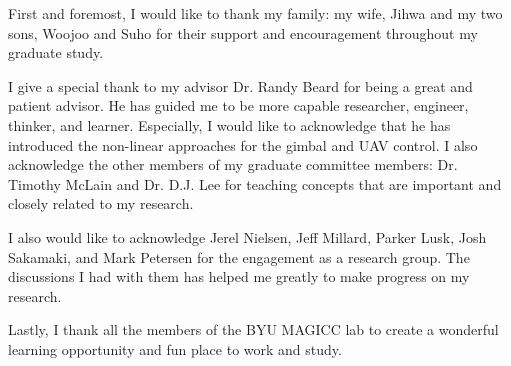 \afterpage{\cleardoublepage}
%
First and foremost, I would like to thank my family: my wife, Jihwa and my two sons, Woojoo and Suho for their support and encouragement throughout my graduate study. 

I give a special thank to my advisor Dr. Randy Beard for being a great and patient advisor. He has guided me to be more capable researcher, engineer, thinker, and learner. Especially, I would like to acknowledge that he has introduced the non-linear approaches for the gimbal and UAV control. I also acknowledge the other members of my graduate committee members: Dr. Timothy McLain and Dr. D.J. Lee for teaching concepts that are important and closely related to my research.

I also would like to acknowledge Jerel Nielsen, Jeff Millard, Parker Lusk, Josh Sakamaki, and Mark Petersen for the engagement as a research group. The discussions I had with them has helped me greatly to make progress on my research. 

Lastly, I thank all the members of the BYU MAGICC lab to create a wonderful learning opportunity and fun place to work and study. 
